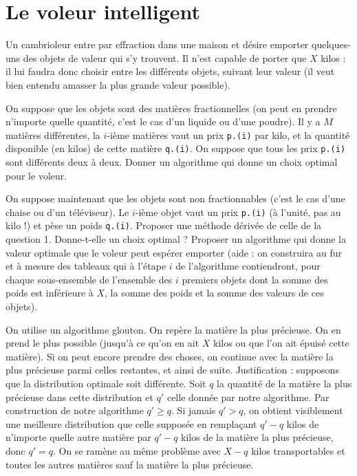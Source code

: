 \section{Le voleur intelligent}

Un cambrioleur entre par effraction dans une maison et désire emporter quelques-uns des objets de valeur qui s'y trouvent. Il n'est capable de porter que $X$ kilos : il lui faudra donc choisir entre les différents objets, suivant leur valeur (il veut bien entendu amasser la plus grande valeur possible).

\Q
On suppose que les objets sont des matières fractionnelles (on peut en prendre n'importe quelle quantité, c'est le cas d'un liquide ou d'une poudre). Il y a $M$ matières différentes, la $i$-ième matières vaut un prix \texttt{p.(i)} par kilo, et la quantité disponible (en kilos) de cette matière \texttt{q.(i)}. On suppose que tous les prix \texttt{p.(i)} sont différents deux à deux. Donner un algorithme qui donne un choix optimal pour le voleur.

\Q
On suppose maintenant que les objets sont non fractionnables (c'est le cas d'une chaise ou d'un téléviseur). Le $i$-ième objet vaut un prix \texttt{p.(i)} (à l'unité, pas au kilo !) et pèse un poids \texttt{q.(i)}. Proposer une méthode dérivée de celle de la question 1. Donne-t-elle un choix optimal ? Proposer un algorithme qui donne la valeur optimale que le voleur peut espérer emporter (aide : on construira au fur et à mesure des tableaux qui à l'étape $i$ de l'algorithme contiendront, pour chaque sous-ensemble de l'ensemble des $i$ premiers objets dont la somme des poids est inférieure à $X$, la somme des poids et la somme des valeurs de ces objets).

\Corrige

\Q
On utilise un algorithme glouton. On repère la matière la plus précieuse. On en prend le plus possible (jusqu'à ce qu'on en ait $X$ kilos ou que l'on ait épuisé cette matière). Si on peut encore prendre des choses, on continue avec la matière la plus précieuse parmi celles restantes, et ainsi de suite. Justification : supposons que la distribution optimale soit différente. Soit $q$ la quantité de la matière la plus précieuse dans cette distribution et $q'$ celle donnée par notre algorithme. Par construction de notre algorithme $q' \geq q$. Si jamais $q' > q$, on obtient visiblement une meilleure distribution que celle supposée en remplaçant $q'-q$ kilos de n'importe quelle autre matière par $q'-q$ kilos de la matière la plus précieuse, donc $q'=q$. On se ramène au même problème avec $X-q$ kilos transportables et toutes les autres matières sauf la matière la plus précieuse.

